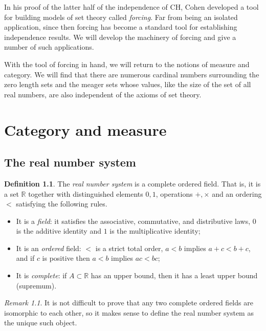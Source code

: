 \documentclass[11pt,oneside]{amsbook}
\newcommand{\RR}{\mathbb R}
\theoremstyle{definition}
\theoremstyle{plain}
\theoremstyle{definition}
\newtheorem{defn}[thm]{Definition}
\theoremstyle{remark}
\newtheorem{rem}[thm]{Remark}
\begin{document}
In his proof of the latter half of the independence of CH, Cohen developed a tool for building models of set theory called \emph{forcing}. Far from being an isolated application, since then forcing has become a standard tool for establishing independence results. We will develop the machinery of forcing and give a number of such applications.

With the tool of forcing in hand, we will return to the notions of measure and category. We will find that there are numerous cardinal numbers surrounding the zero length sets and the meager sets whose values, like the size of the set of all real numbers, are also independent of the axioms of set theory.


\chapter{Category and measure}

\section{The real number system}

\begin{defn}
  The \emph{real number system} is a complete ordered field. That is, it is a set $\RR$ together with distinguished elements $0,1$, operations $+,\times$ and an ordering $<$ satisfying the following rules.
\begin{itemize}
\item It is a \emph{field}: it satisfies the associative, commutative, and distributive laws, $0$ is the additive identity and $1$ is the multiplicative identity;
\item It is an \emph{ordered} field: $<$ is a strict total order, $a<b$ implies $a+c<b+c$, and if $c$ is positive then $a<b$ implies $ac<bc$;
\item It is \emph{complete}: if $A\subset\RR$ has an upper bound, then it has a least upper bound (supremum).
\end{itemize}
\end{defn}

\begin{rem}
  It is not difficult to prove that any two complete ordered fields are isomorphic to each other, so it makes sense to define the real number system as the unique such object.
\end{rem}
\end{document}
